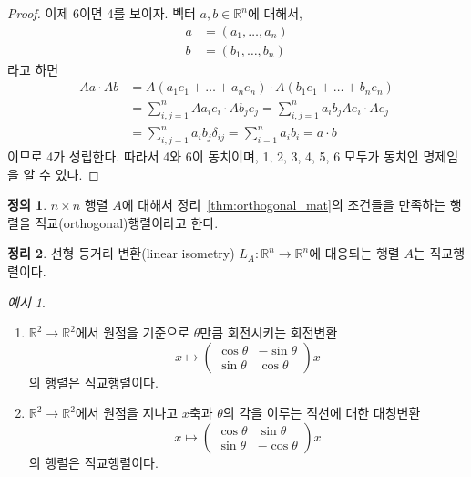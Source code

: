 \documentclass[unfonts,oneside,a4paper]{oblivoir}
\theoremstyle{definition}
\newtheorem{definition}{정의}[section]
\theoremstyle{theorem}
\newtheorem{theorem}[definition]{정리}
\theoremstyle{theorem}
\theoremstyle{remark}
\theoremstyle{remark}
\theoremstyle{remark}
\newtheorem*{example}{예시}
\theoremstyle{remark}
\renewcommand{\vec}[1]{\bm{\mathit{#1}}}
\begin{document}
\begin{proof}
    이제 6이면 4를 보이자.
    벡터 $\vec a, \vec b \in \mathbb R^n$에 대해서,
    \begin{align*}
        \vec a &= (a_1, \dots, a_n)\\
        \vec b &= (b_1, \dots, b_n)
    \end{align*}
    라고 하면
    \begin{align*}
        A \vec a \cdot A \vec b &= A(a_1 \vec e_1 + \dots + a_n \vec e_n) \cdot A (b_1 \vec e_1 + \dots + b_n \vec e_n)\\
                                &= \sum_{i, j = 1}^n A a_i \vec e_i \cdot A b_j \vec e_j = \sum_{i, j = 1}^n a_i b_j A \vec e_i \cdot A \vec e_j\\
                                &= \sum_{i, j = 1}^n a_i b_j \delta_{ij} = \sum_{i = 1}^n a_i b_i = \vec a \cdot \vec b
    \end{align*}
    이므로 4가 성립한다.
    따라서 4와 6이 동치이며, 1, 2, 3, 4, 5, 6 모두가 동치인 명제임을 알 수 있다.
\end{proof}

\begin{definition} \label{def:orthogonal_mat}
    $n \times n$ 행렬 $A$에 대해서 정리~\ref{thm:orthogonal_mat}의 조건들을 만족하는 행렬을 직교(orthogonal)행렬이라고 한다.
\end{definition}

\begin{theorem}
    선형 등거리 변환(linear isometry) $L_A: \mathbb R^n \rightarrow \mathbb R^n$에 대응되는 행렬 $A$는 직교행렬이다.
\end{theorem}

\begin{example}
    \leavevmode
    \begin{enumerate}
        \item $\mathbb R^2 \rightarrow \mathbb R^2$에서 원점을 기준으로 $\theta$만큼 회전시키는 회전변환 
            \begin{equation*}
                \vec x \mapsto \begin{pmatrix}\cos \theta & -\sin \theta \\ \sin \theta & \cos \theta\end{pmatrix} \vec x
            \end{equation*}
        의 행렬은 직교행렬이다.
        \item $\mathbb R^2 \rightarrow \mathbb R^2$에서 원점을 지나고 $x$축과 $\theta$의 각을 이루는 직선에 대한 대칭변환 
            \begin{equation*}
                \vec x \mapsto \begin{pmatrix}\cos \theta & \sin \theta \\ \sin \theta & -\cos \theta\end{pmatrix} \vec x
            \end{equation*}
        의 행렬은 직교행렬이다.
    \end{enumerate}
\end{example}
\end{document}
